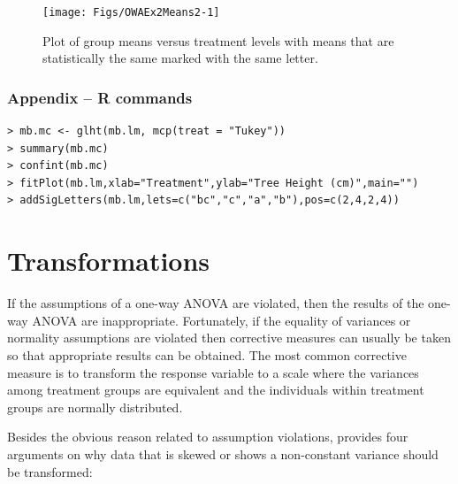 \documentclass[10pt,openany]{book}\usepackage[]{graphicx}\usepackage[]{color}
\newenvironment{knitrout}{}{} %
\begin{document}
\begin{knitrout}
\color{fgcolor}\begin{figure}[hbtp]

{\centering \texttt{[image: Figs/OWAEx2Means2-1]} 

}

\caption[Plot of group means versus treatment levels with means that are statistically the same marked with the same letter]{Plot of group means versus treatment levels with means that are statistically the same marked with the same letter.}\label{fig:OWAEx2Means2}
\end{figure}


\end{knitrout}

\subsubsection*{Appendix -- R commands}
\begin{Verbatim}[formatcom=\color{red},xleftmargin=5mm,commandchars=\\\{\}]
> mb.mc <- glht(mb.lm, mcp(treat = "Tukey"))
> summary(mb.mc)
> confint(mb.mc)
> fitPlot(mb.lm,xlab="Treatment",ylab="Tree Height (cm)",main="")
> addSigLetters(mb.lm,lets=c("bc","c","a","b"),pos=c(2,4,2,4))
\end{Verbatim}


\section{Transformations} \label{sect:AOVTransformations}
If the assumptions of a one-way ANOVA are violated, then the results of the one-way ANOVA are inappropriate.  Fortunately, if the equality of variances or normality assumptions are violated then corrective measures can usually be taken so that appropriate results can be obtained.  The most common corrective measure is to transform the response variable to a scale where the variances among treatment groups are equivalent and the individuals within treatment groups are normally distributed.

Besides the obvious reason related to assumption violations, \cite{Fox1997} provides four arguments on why data that is skewed or shows a non-constant variance should be transformed:
\end{document}
